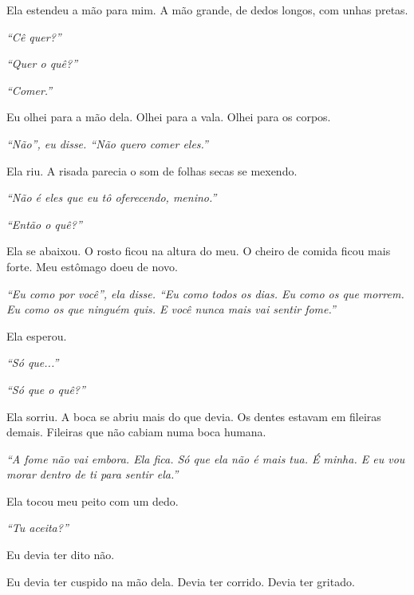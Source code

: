 \noindent Ela estendeu a mão para mim. A mão grande, de dedos longos, com unhas pretas.

\noindent \textit{\textquotedblleft{}Cê quer?\textquotedblright{}}

\noindent \textit{\textquotedblleft{}Quer o quê?\textquotedblright{}}

\noindent \textit{\textquotedblleft{}Comer.\textquotedblright{}}

\noindent Eu olhei para a mão dela. Olhei para a vala. Olhei para os corpos.

\noindent \textit{\textquotedblleft{}Não\textquotedblright{}\textit{, eu disse. }\textquotedblleft{}Não quero comer eles.\textquotedblright{}}

\noindent Ela riu. A risada parecia o som de folhas secas se mexendo.

\noindent \textit{\textquotedblleft{}Não é eles que eu tô oferecendo, menino.\textquotedblright{}}

\noindent \textit{\textquotedblleft{}Então o quê?\textquotedblright{}}

\noindent Ela se abaixou. O rosto ficou na altura do meu. O cheiro de comida ficou mais forte. Meu estômago doeu de novo.

\noindent \textit{\textquotedblleft{}Eu como por você\textquotedblright{}\textit{, ela disse. }\textquotedblleft{}Eu como todos os dias. Eu como os que morrem. Eu como os que ninguém quis. E você nunca mais vai sentir fome.\textquotedblright{}}

\noindent Ela esperou.

\noindent \textit{\textquotedblleft{}Só que...\textquotedblright{}}

\noindent \textit{\textquotedblleft{}Só que o quê?\textquotedblright{}}

\noindent Ela sorriu. A boca se abriu mais do que devia. Os dentes estavam em fileiras demais. Fileiras que não cabiam numa boca humana.

\noindent \textit{\textquotedblleft{}A fome não vai embora. Ela fica. Só que ela não é mais tua. É minha. E eu vou morar dentro de ti para sentir ela.\textquotedblright{}}

\noindent Ela tocou meu peito com um dedo.

\noindent \textit{\textquotedblleft{}Tu aceita?\textquotedblright{}}

\noindent Eu devia ter dito não.

\noindent Eu devia ter cuspido na mão dela. Devia ter corrido. Devia ter gritado.

